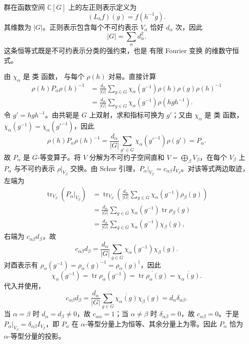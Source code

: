 群在函数空间 $\mathbb C[G]$ 上的左正则表示定义为
\[
(L_hf)(g)=f(h^{-1}g).
\]
其维数为 $|G|$。正则表示包含每个不可约表示 $V_\alpha$ 恰好 $d_\alpha$ 次，因此
\begin{equation*}|G|=\sum_\alpha d_\alpha^2.\end{equation*}
这条恒等式既是不可约表示分类的强约束，也是 有限 Fourier 变换 的维数守恒式。

由 $\chi_\alpha$ 是 类 函数， 与每个 $\rho(h)$ 对易。直接计算
\begin{align*}
\rho(h)P_\alpha\rho(h)^{-1}
&=\frac{d_\alpha}{|G|}
\sum_{g\in G}
\chi_\alpha(g^{-1})\rho(h)\rho(g)\rho(h)^{-1}\\
&=\frac{d_\alpha}{|G|}
\sum_{g\in G}
\chi_\alpha(g^{-1})\rho(hgh^{-1}).
\end{align*}
令 $g'=hgh^{-1}$。由共轭是 $G$ 上双射，求和指标可换为 $g'$；又由 $\chi_\alpha$ 是 类 函数，$\chi_\alpha(g^{-1})=\chi_\alpha(g'^{-1})$，因此
\[
\rho(h)P_\alpha\rho(h)^{-1}
=\frac{d_\alpha}{|G|}
\sum_{g'\in G}
\chi_\alpha(g'^{-1})\rho(g')
=P_\alpha.
\]
故 $P_\alpha$ 是 $G$-等变算子。将 $V$ 分解为不可约子空间直和 $V=\bigoplus_\beta V_\beta$，在每个 $V_\beta$ 上 $P_\alpha$ 与不可约表示 $\rho|_{V_\beta}$ 交换。由 Schur 引理，$P_\alpha|_{V_\beta}=c_{\alpha\beta}I_{V_\beta}$。对该等式两边取迹，左端为
\begin{align*}
\operatorname{tr}_{V_\beta}(P_\alpha|_{V_\beta})
&=\operatorname{tr}_{V_\beta}\!\left(
\frac{d_\alpha}{|G|}
\sum_{g\in G}
\chi_\alpha(g^{-1})\rho_\beta(g)\right)\\
&=\frac{d_\alpha}{|G|}
\sum_{g\in G}
\chi_\alpha(g^{-1})\operatorname{tr}\rho_\beta(g)\\
&=\frac{d_\alpha}{|G|}
\sum_{g\in G}
\chi_\alpha(g^{-1})\chi_\beta(g),
\end{align*}
右端为 $c_{\alpha\beta}d_\beta$，故
\[
c_{\alpha\beta}d_\beta
=
\frac{d_\alpha}{|G|}
\sum_{g\in G}
\chi_\alpha(g^{-1})\chi_\beta(g).
\]
对酉表示有 $\rho_\alpha(g^{-1})=\rho_\alpha(g)^{-1}=\rho_\alpha(g)^\dagger$，因此
\[
\chi_\alpha(g^{-1})
=\operatorname{tr}\rho_\alpha(g^{-1})
=\overline{\operatorname{tr}\rho_\alpha(g)}
=\overline{\chi_\alpha(g)}.
\]
代入并使用，
\[
c_{\alpha\beta}d_\beta
=\frac{d_\alpha}{|G|}
\sum_{g\in G}
\overline{\chi_\alpha(g)}\chi_\beta(g)
=d_\alpha\delta_{\alpha\beta}.
\]
当 $\alpha=\beta$ 时 $d_\alpha=d_\beta\neq0$，故 $c_{\alpha\alpha}=1$；当 $\alpha\neq\beta$ 时 $\delta_{\alpha\beta}=0$，故 $c_{\alpha\beta}=0$。于是 $P_\alpha|_{V_\beta}=\delta_{\alpha\beta}I_{V_\beta}$，即 $P_\alpha$ 在 $\alpha$-等型分量上为恒等、其余分量上为零。因此 $P_\alpha$ 恰为 $\alpha$-等型分量的投影。

